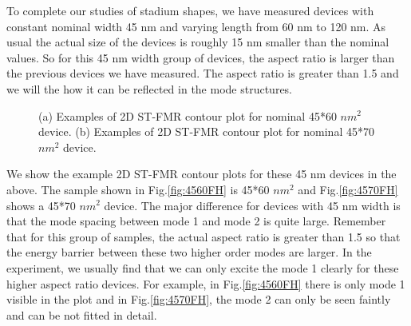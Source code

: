 To complete our studies of stadium shapes, we have measured devices with constant nominal width 45 nm and varying length from 60 nm to 120 nm. As usual the actual size of the devices is roughly 15 nm smaller than the nominal values. So for this 45 nm width group of devices, the aspect ratio is larger than the previous devices we have measured. The aspect ratio is greater than 1.5 and we will the how it can be reflected in the mode structures.

\begin{figure}[!ht]
\centering
\label{fig:452D}
\caption{(a) Examples of 2D ST-FMR contour plot for nominal 45*60 $nm^2$ device. (b) Examples of 2D ST-FMR contour plot for nominal 45*70 $nm^2$ device.}
\end{figure}


We show the example 2D ST-FMR contour plots for these 45 nm devices in the above. The sample shown in Fig.\ref{fig:4560FH} is 45*60 $nm^2$ and Fig.\ref{fig:4570FH} shows a 45*70 $nm^2$ device. The major difference for devices with 45 nm width is that the mode spacing between mode 1 and mode 2 is quite large. Remember that for this group of samples, the actual aspect ratio is greater than 1.5 so that the energy barrier between these two higher order modes are larger. In the experiment, we usually find that we can only excite the mode 1 clearly for these higher aspect ratio devices. For example, in Fig.\ref{fig:4560FH} there is only mode 1 visible in the plot and in Fig.\ref{fig:4570FH}, the mode 2 can only be seen faintly and can be not fitted in detail.

